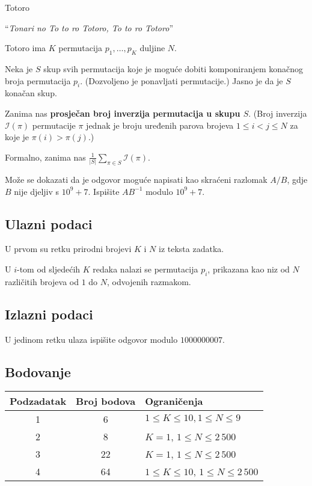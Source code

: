 \begin{statement}[
  problempoints=100,
  timelimit=1 sekunda,
  memorylimit=512 MiB,
]{Totoro}

``\textit{Tonari no To to ro Totoro, To to ro Totoro}'' 

Totoro ima $K$ permutacija $p_1, \ldots, p_K$ duljine $N$.

Neka je $S$ skup svih permutacija koje je moguće
dobiti komponiranjem konačnog broja permutacija $p_i$.
(Dozvoljeno je ponavljati permutacije.)
Jasno je da je $S$ konačan skup.

Zanima nas \textbf{prosječan broj inverzija permutacija u skupu $S$}.
(Broj inverzija $\mathcal{I}(\pi)$ permutacije $\pi$ 
jednak je broju uređenih parova
brojeva $1 \le i < j \le N$ za koje je $\pi(i) > \pi(j)$.)

Formalno, zanima nas $\frac{1}{|S|} \sum_{\pi \in S} \mathcal{I} (\pi)$.

Može se dokazati da je odgovor moguće napisati
kao skraćeni razlomak $A/B$, gdje $B$ nije djeljiv s $10^9 + 7$. 
Ispišite $AB^{-1}$ modulo $10^9 + 7$.
\subsection*{Ulazni podaci}
U prvom su retku prirodni brojevi $K$ i $N$ iz teksta zadatka.

U $i$-tom od sljedećih $K$ redaka nalazi se permutacija $p_i$, 
prikazana kao niz od $N$ različitih brojeva od $1$ do $N$, odvojenih razmakom.

\subsection*{Izlazni podaci}
U jedinom retku ulaza ispišite odgovor modulo $1 000 000 007$. 


\subsection*{Bodovanje}
{\renewcommand{\arraystretch}{1.4}
  \setlength{\tabcolsep}{6pt}
  \begin{tabular}{ccl}
 Podzadatak & Broj bodova & Ograničenja \\ \midrule
  1 & 6 & $ 1 \le K \le 10, 1 \le N \le 9$ \\
  2 & 8 & $ K = 1 $, $1 \le N \le 2\,500$ \\
  3 & 22 & $ K = 1$, $1 \le N \le 2\,500$ \\
  4 & 64 & $1 \le K \le 10$, $1 \le N \le 2\,500$ \\
\end{tabular}}


\end{statement}
